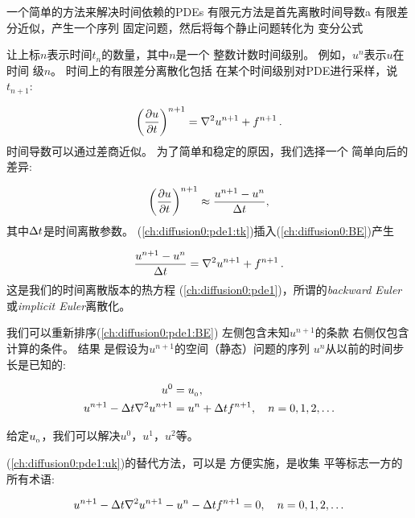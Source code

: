 一个简单的方法来解决时间依赖的PDEs
有限元方法是首先离散时间导数a
有限差分近似，产生一个序列
固定问题，然后将每个静止问题转化为
变分公式

让上标$n$表示时间$t_n$的数量，其中$n$是一个
整数计数时间级别。 例如，$u^n$表示$u$在时间
级$n$。 时间上的有限差分离散化包括
在某个时间级别对PDE进行采样，说$t_{n + 1}$:


\begin{equation}
\left({\partial u \over\partial t}\right)^{n+1} = \nabla^2 u^{n+1} + f^{n+1}\thinspace .
\label{ch:diffusion0:pde1:tk}
\end{equation}
时间导数可以通过差商近似。
为了简单和稳定的原因，我们选择一个
简单向后的差异:


\begin{equation}
\left({\partial u\over\partial t}\right)^{n+1}\approx {{u^{n+1} - u^n}\over{\Delta t}},
\label{ch:diffusion0:BE}
\end{equation}
其中$\Delta t$是时间离散参数。
(\ref{ch:diffusion0:pde1:tk})插入(\ref{ch:diffusion0:BE})产生

\begin{equation}
{{u^{n+1} - u^n}\over{\Delta t}} = \nabla^2 u^{n+1} + f^{n+1}\thinspace .
\label{ch:diffusion0:pde1:BE}
\end{equation}
这是我们的时间离散版本的热方程
(\ref{ch:diffusion0:pde1})，所谓的\emph{backward Euler}或\emph{implicit
  Euler}离散化。

我们可以重新排序(\ref{ch:diffusion0:pde1:BE})
左侧包含未知$u^{n+1}$的条款
右侧仅包含计算的条件。 结果
是假设为$u^{n+1}$的空间（静态）问题的序列
$u^n$从以前的时间步长是已知的:

\begin{align}
u^0 &= u_{_0}, \label{ch:diffusion0:pde1:u0}\\
u^{n+1} - {\Delta t}\nabla^2 u^{n+1} &=  u^n + {\Delta t} f^{n+1},\quad n=0,1,2,\ldots
\label{ch:diffusion0:pde1:uk}
\end{align}

给定$u_{_0}$，我们可以解决$u^0$，$u^1$，$u^2$等。

(\ref{ch:diffusion0:pde1:uk})的替代方法，可以是
方便实施，是收集
平等标志一方的所有术语:

\begin{equation}
u^{n+1} - {\Delta t}\nabla^2 u^{n+1} -  u^{n} - {\Delta t} f^{n+1} = 0,\quad n=0,1,2,\ldots
\label{ch:diffusion0:pde1:uk2}
\end{equation}

